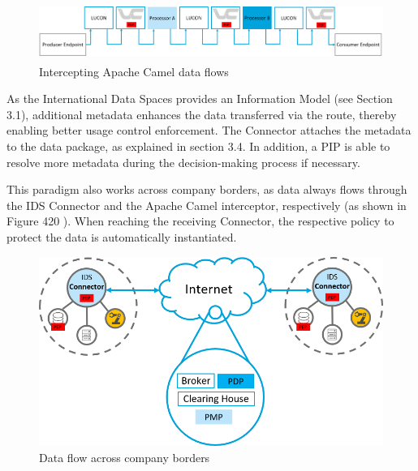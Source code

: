 
\begin{figure}[H]
	\begin{Center}
		\includegraphics[width=5.11in,height=0.74in]{./media/image75.png}
		\caption{Intercepting Apache Camel data flows}
		\label{fig:Intercepting_Apache_Camel_data_flows}
	\end{Center}
\end{figure}




As the International Data Spaces provides an Information Model (see Section 3.1), additional metadata enhances the data transferred via the route, thereby enabling better usage control enforcement. The Connector attaches the metadata to the data package, as explained in section 3.4. In addition, a PIP is able to resolve more metadata during the decision-making process if necessary.

This paradigm also works across company borders, as data always flows through the IDS Connector and the Apache Camel interceptor, respectively (as shown in Figure 420 ). When reaching the receiving Connector, the respective policy to protect the data is automatically instantiated.



\begin{figure}[H]
	\begin{Center}
		\includegraphics{./media/image76.png} %
		\caption{Data flow across company borders}
		\label{fig:Data_flow_across_company_borders}
	\end{Center}
\end{figure}


